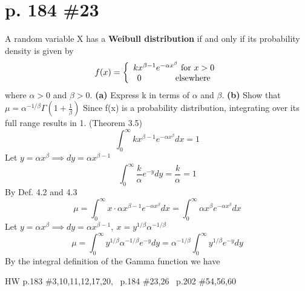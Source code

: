 \documentclass[12pt]{article}
\begin{document}
	\section[20pt]{p. 184 \#23}
	A random variable X has a \textbf{Weibull distribution} if and only if its probability density is given by
	\[ f(x)=\left\{\begin{array}{ccc}
	kx^{\beta-1}e^{-\alpha x^\beta} \textup{ for } x>0\\ 0 \ \ \ \ \ \ \ \ \ \ \ \ \textup{elsewhere}
	\end{array}\right. \]
	where \(\alpha>0\) and \(\beta>0\). \newline
	\textbf{(a)} Express k in terms of \(\alpha\) and \(\beta\). \newline
	\textbf{(b)} Show that \(\mu=\alpha^{-1/\beta}\Gamma\left(1+\frac{1}{\beta}\right)\) \newline \newline
	Since f(x) is a probability distribution, integrating over its full range results in 1. (Theorem 3.5)
	\[\int_0^{\infty}kx^{\beta-1}e^{-\alpha x^\beta}dx=1\]
	Let \(y=\alpha x^\beta \implies dy = \alpha x^{\beta-1}\)
	\[\int_0^{\infty}\frac{k}{\alpha}e^{-y}dy=\frac{k}{\alpha}=1\]
	 \newline \newline
	By Def. 4.2 and 4.3 
	\[\mu=\int_0^{\infty}x\cdot \alpha x^{\beta-1}e^{-\alpha x^\beta}dx=\int_0^{\infty}\alpha x^{\beta}e^{-\alpha x^\beta}dx\]
	Let \(y=\alpha x^\beta\implies dy = \alpha x^{\beta-1}, \ x = y^{1/\beta}\alpha^{-1/\beta}\)
	\[\mu=\int_0^{\infty}y^{1/\beta}\alpha^{-1/\beta}e^{-y}dy=\alpha^{-1/\beta}\int_0^{\infty}y^{1/\beta}e^{-y}dy\]
	By the integral definition of the Gamma function we have
	\newline {}
	\newpage
	\maketitle HW p.183 \#3,10,11,12,17,20, \ p.184 \#23,26 \ p.202 \#54,56,60
\end{document}
